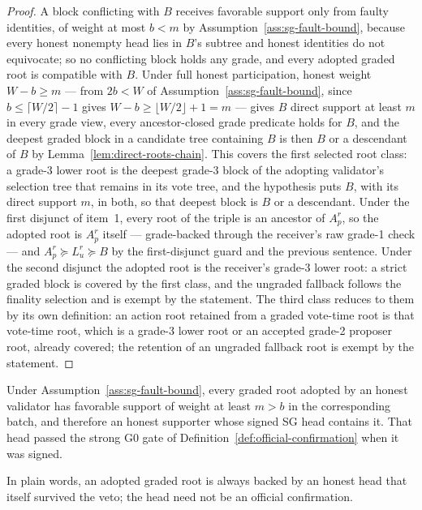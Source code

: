 \begin{proof}
A block conflicting with \(B\) receives favorable support only from
faulty identities, of weight at most \(b<m\) by
Assumption~\ref{ass:sg-fault-bound}, because every honest
nonempty head lies in \(B\)'s subtree and honest identities do not
equivocate; so no conflicting block holds any grade, and every adopted
graded root is compatible with \(B\).  Under full honest participation,
honest weight \(W-b\geq m\) --- from \(2b<W\) of
Assumption~\ref{ass:sg-fault-bound}, since \(b\leq\lceil W/2\rceil-1\)
gives \(W-b\geq\lfloor W/2\rfloor+1=m\) ---
gives \(B\) direct support at least \(m\)
in every grade view, every ancestor-closed grade predicate holds for
\(B\), and the deepest graded block in a candidate tree containing
\(B\) is then \(B\) or a descendant of \(B\) by Lemma~\ref{lem:direct-roots-chain}.
This covers the first selected root class: a grade-3 lower root is the
deepest grade-3 block of the adopting validator's selection tree that
remains in its vote tree, and the hypothesis puts \(B\), with its direct
support \(m\), in both, so that deepest block is \(B\) or a descendant.
Under the first disjunct of item~1, every root of the triple is an
ancestor of \(A_p^r\), so the adopted root is \(A_p^r\) itself ---
grade-backed through the receiver's raw grade-1 check --- and
\(A_p^r\succeq L_u^r\succeq B\) by the first-disjunct guard and the
previous sentence.  Under the second disjunct the adopted root is the
receiver's grade-3 lower root: a strict graded block is covered by the
first class, and the ungraded fallback follows the finality selection
and is exempt by the statement.  The third class reduces to them by its own
definition: an action root retained from a graded vote-time root is that
vote-time root, which is a grade-3
lower root or an accepted grade-2 proposer root, already covered; the
retention of an ungraded fallback root is exempt by the statement.
\end{proof}

\begin{lemma}
\label{lem:root-backing}
Under Assumption~\ref{ass:sg-fault-bound}, every graded root adopted by
an honest validator has favorable support of
weight at least \(m>b\) in the corresponding batch, and therefore an
honest supporter whose signed SG head contains it.  That head passed the
strong G0 gate of Definition~\ref{def:official-confirmation} when it was
signed.

In plain words, an adopted graded root is always backed by an honest head that itself
survived the veto; the head need not be an official confirmation.
\end{lemma}

